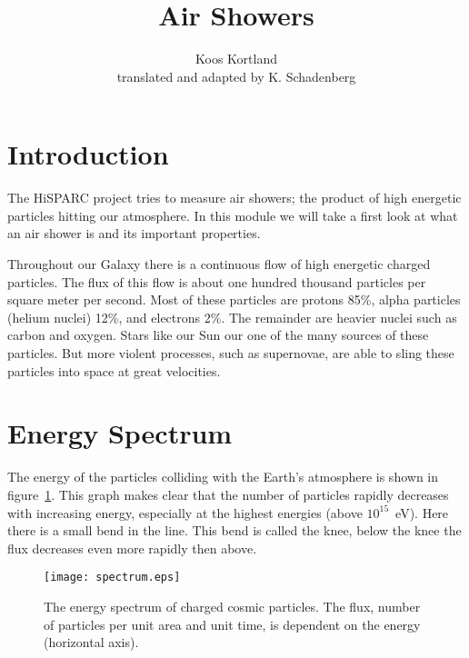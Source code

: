



\author{Koos Kortland \\ translated and adapted by K. Schadenberg}
\date{}
\title{Air Showers}



\maketitle

\section{Introduction}
The HiSPARC project tries to measure air showers; the product of high energetic particles hitting our atmosphere. In this module we will take a first look at what an air shower is and its important properties.

Throughout our Galaxy there is a continuous flow of high energetic charged particles. The flux of this flow is about one hundred thousand particles per square meter per second. Most of these particles are protons 85\%, alpha particles (helium nuclei) 12\%, and electrons 2\%. The remainder are heavier nuclei such as carbon and oxygen. Stars like our Sun our one of the many sources of these particles. But more violent processes, such as supernovae, are able to sling these particles into space at great velocities.

\section{Energy Spectrum}
The energy of the particles colliding with the Earth's atmosphere is shown in figure~\ref{fig:spectrum}. This graph makes clear that the number of particles rapidly decreases with increasing energy, especially at the highest energies (above $10^{15}$~eV). Here there is a small bend in the line. This bend is called the knee, below the knee the flux decreases even more rapidly then above.

\begin{figure}\begin{center}
\texttt{[image: spectrum.eps]}%
\caption{The energy spectrum of charged cosmic particles. The flux, number of particles per unit area and unit time, is dependent on the energy (horizontal axis).}\label{fig:spectrum}
\end{center}\end{figure}


